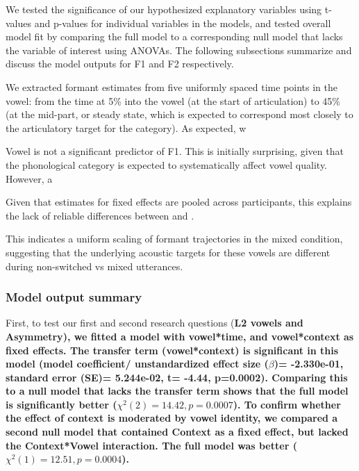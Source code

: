We tested the significance of our hypothesized explanatory variables using t-values and p-values for individual variables in the models, and tested overall model fit by comparing the full model to a corresponding null model that lacks the variable of interest using ANOVAs. The following subsections summarize and discuss the model outputs for F1 and F2 respectively.


We extracted formant estimates from five uniformly spaced time points in the vowel: from the time at 5\% into the vowel (at the start of articulation) to 45\% (at the mid-part, or steady state, which is expected to correspond most closely to the articulatory target for the category). As expected, w

Vowel is not a significant predictor of F1. This is initially surprising, given that the phonological category is expected to systematically affect vowel quality. However, a

Given that estimates for fixed effects are pooled across participants, this explains the lack of reliable differences between  and \nt{\ae}.

This indicates a uniform scaling of formant trajectories in the mixed condition, suggesting that the underlying acoustic targets for these vowels are different during non-switched vs mixed utterances. 



\subsubsection*{Model output summary}

First, to test our first and second research questions (\bf{L2 vowels and Asymmetry}), we fitted a model with vowel*time, and vowel*context as fixed effects. The transfer term (vowel*context) is significant in this model (model coefficient/ unstandardized effect size ($\beta$)= -2.330e-01, standard error (SE)=  5.244e-02, t= -4.44, p=0.0002). Comparing this to a null model that lacks the transfer term shows that the full model is significantly better ($\chi^2(2) = 14.42, p=  0.0007$). To confirm whether the effect of context is moderated by vowel identity, we compared a second null model that contained Context as a fixed effect, but lacked the Context*Vowel interaction. The full model was better ($\chi^2(1) = 12.51, p= 0.0004$).

